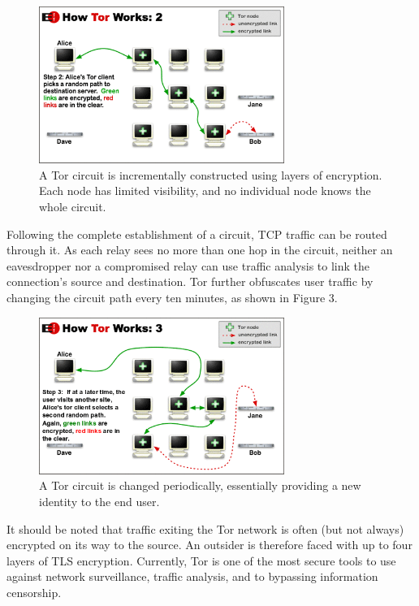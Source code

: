 \documentclass[journal]{IEEEtran}
\begin{document}
\begin{figure}[htbp]
\centering
\begin{minipage}{8 cm}
    \includegraphics[width=80mm]{resources/circuit-building-2.png}
    \caption{A Tor circuit is incrementally constructed using layers of encryption. Each node has limited visibility, and no individual node knows the whole circuit.}
\end{minipage}
\end{figure}

Following the complete establishment of a circuit, TCP traffic can be routed through it. As each relay sees no more than one hop in the circuit, neither an eavesdropper nor a compromised relay can use traffic analysis to link the connection's source and destination. Tor further obfuscates user traffic by changing the circuit path every ten minutes,\cite{McCoy2008} as shown in Figure 3.

\begin{figure}[htbp]
\centering
\begin{minipage}{8 cm}
  \includegraphics[width=80mm]{resources/circuit-building-3.png}
  \caption{A Tor circuit is changed periodically, essentially providing a new identity to the end user.}
\end{minipage}
\end{figure}

It should be noted that traffic exiting the Tor network is often (but not always) encrypted on its way to the source. An outsider is therefore faced with up to four layers of TLS encryption. Currently, Tor is one of the most secure tools to use against network surveillance, traffic analysis, and to bypassing information censorship.
\end{document}

